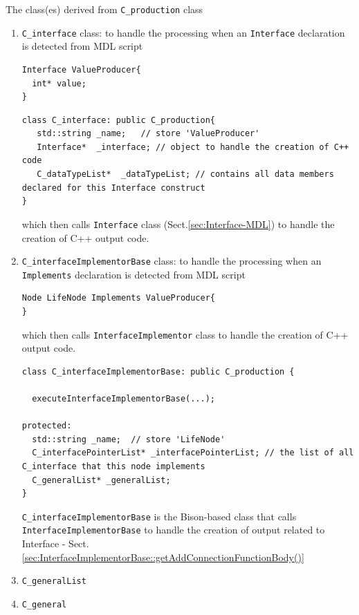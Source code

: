 The class(es) derived from \verb!C_production! class
\begin{enumerate}
  
  \item \verb!C_interface! class: to handle the processing when an \verb!Interface! declaration is detected from MDL script
  \label{sec:C_interface-MDL}

\begin{verbatim}
Interface ValueProducer{
  int* value;
}
\end{verbatim}  

\begin{lstlisting}
class C_interface: public C_production{
   std::string _name;   // store 'ValueProducer'
   Interface*  _interface; // object to handle the creation of C++ code
   C_dataTypeList*  _dataTypeList; // contains all data members declared for this Interface construct
}
\end{lstlisting}
which then calls \verb!Interface! class (Sect.\ref{sec:Interface-MDL}) to handle the creation of C++ output code.
  
  \item \verb!C_interfaceImplementorBase! class: to handle the processing when an \verb!Implements! declaration is detected from MDL script
  \label{sec:C_interfaceImplementorBase-MDL}

\begin{verbatim}
Node LifeNode Implements ValueProducer{
}
\end{verbatim}
which then calls \verb!InterfaceImplementor! class to handle the creation of C++ output code.


\begin{lstlisting}
class C_interfaceImplementorBase: public C_production {

  executeInterfaceImplementorBase(...);
  
protected:
  std::string _name;  // store 'LifeNode'
  C_interfacePointerList* _interfacePointerList; // the list of all C_interface that this node implements
  C_generalList* _generalList;
}
\end{lstlisting}

 \verb!C_interfaceImplementorBase! is the Bison-based class that calls \verb!InterfaceImplementorBase!
  to handle the creation of output related to Interface - Sect.\ref{sec:InterfaceImplementorBase::getAddConnectionFunctionBody()}
  


   \item \verb!C_generalList!
   
   
   \item \verb!C_general!
\end{enumerate}


